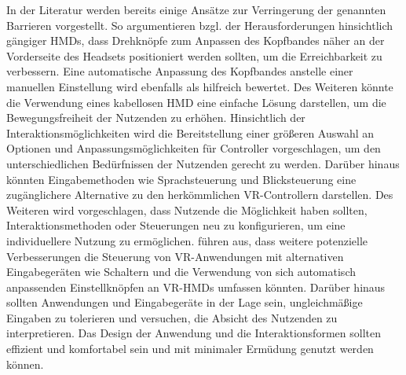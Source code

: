 In der Literatur werden bereits einige Ansätze zur Verringerung der genannten Barrieren vorgestellt. So argumentieren \citet{mott_i_2020} bzgl. der Herausforderungen hinsichtlich gängiger HMDs, dass Drehknöpfe zum Anpassen des Kopfbandes näher an der Vorderseite des Headsets positioniert werden sollten, um die Erreichbarkeit zu verbessern. Eine automatische Anpassung des Kopfbandes anstelle einer manuellen Einstellung wird ebenfalls als hilfreich bewertet. Des Weiteren könnte die Verwendung eines kabellosen HMD eine einfache Lösung darstellen, um die Bewegungsfreiheit der Nutzenden zu erhöhen. Hinsichtlich der Interaktionsmöglichkeiten wird die Bereitstellung einer größeren Auswahl an Optionen und Anpassungsmöglichkeiten für Controller vorgeschlagen, um den unterschiedlichen Bedürfnissen der Nutzenden gerecht zu werden. Darüber hinaus könnten Eingabemethoden wie Sprachsteuerung und Blicksteuerung eine zugänglichere Alternative zu den herkömmlichen VR-Controllern darstellen. Des Weiteren wird vorgeschlagen, dass Nutzende die Möglichkeit haben sollten, Interaktionsmethoden oder Steuerungen neu zu konfigurieren, um eine individuellere Nutzung zu ermöglichen. \citet{dombrowski_designing_2019} führen aus, dass weitere potenzielle Verbesserungen die Steuerung von VR-Anwendungen mit alternativen Eingabegeräten wie Schaltern und die Verwendung von sich automatisch anpassenden Einstellknöpfen an VR-HMDs umfassen könnten. Darüber hinaus sollten Anwendungen und Eingabegeräte in der Lage sein, ungleichmäßige Eingaben zu tolerieren und versuchen, die Absicht des Nutzenden zu interpretieren. Das Design der Anwendung und die Interaktionsformen sollten effizient und komfortabel sein und mit minimaler Ermüdung genutzt werden können.


